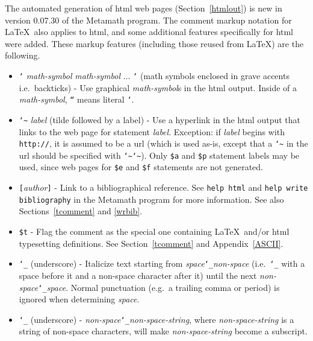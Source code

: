 The automated generation of {\sc html} web pages
(Section~\ref{htmlout}) is new in version 0.07.30 of the Metamath program.
The comment markup notation for \LaTeX\ also applies to {\sc html}, and
some additional features specifically for {\sc html} were added.
These markup features (including those reused from \LaTeX) are the
following.
\begin{itemize}
 \item[]
         \texttt{`} {\em math-symbol} {\em math-symbol} ... \texttt{`}
             (math symbols enclosed in grave accents i.e.\ backticks) -
             Use graphical {\em math-symbol}s
             in the {\sc html} output.
             Inside of a {\em math-symbol}, \texttt{``} means literal \texttt{`}.
 \item[]
         \texttt{\char`\~} {\em label} (tilde followed by a label)
             - Use  a hyperlink in the {\sc html} output
             that links to the web page for statement {\em label}.
             Exception:  if {\em label} begins with \texttt{http://},
             it is assumed to be
             a {\sc url} (which is used as-is, except that
             a \texttt{\char`\~} in the {\sc url} should
             be specified with \texttt{\char`\~}\texttt{\char`\~}).
             Only \texttt{\$a} and \texttt{\$p}
             statement labels may be used, since web pages for
             \texttt{\$e} and \texttt{\$f} statements are not generated.
 \item[]
         \texttt{[}{\em author}\texttt{]} - Link to a bibliographical reference. See
             \texttt{help html} and \texttt{help write
             bibliography} in the Metamath program for more
            information.\index{\texttt{\char`\[}\ldots\texttt{]} inside comments}
            See also Sections~\ref{tcomment} and \ref{wrbib}.
 \item[]
         \texttt{\$t} - Flag the comment as the special
             one
             containing \LaTeX\ and/or {\sc html} typesetting
             definitions.  See Section~\ref{tcomment} and Appendix~\ref{ASCII}.
 \item[]
         \texttt{\char`\_} (underscore) -
             Italicize text starting from
              {\em space}\texttt{\char`\_}{\em non-space} (i.e.\ \texttt{\char`\_}
              with a space before it and a non-space character after it) until
             the next
             {\em non-space}\texttt{\char`\_}{\em space}.  Normal
             punctuation (e.g.\ a trailing
             comma or period) is ignored when determining {\em space}.
 \item[]
         \texttt{\char`\_} (underscore) - {\em
         non-space}\texttt{\char`\_}{\em non-space-string}, where
          {\em non-space-string} is a string of non-space characters,
         will make {\em non-space-string} become a subscript.
\end{itemize}
